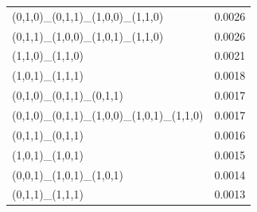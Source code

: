 \documentclass[11pt]{article}
\begin{document}
\begin{minipage}[t]{\linewidth}
\begin{tabular}{@{}lr@{}}
(0,1,0)\_(0,1,1)\_(1,0,0)\_(1,1,0)                & 0.0026 \\
(0,1,1)\_(1,0,0)\_(1,0,1)\_(1,1,0)                & 0.0026 \\
(1,1,0)\_(1,1,0)                                   & 0.0021 \\
(1,0,1)\_(1,1,1)                                   & 0.0018 \\
(0,1,0)\_(0,1,1)\_(0,1,1)                         & 0.0017 \\
(0,1,0)\_(0,1,1)\_(1,0,0)\_(1,0,1)\_(1,1,0)      & 0.0017 \\
(0,1,1)\_(0,1,1)                                   & 0.0016 \\
(1,0,1)\_(1,0,1)                                   & 0.0015 \\
(0,0,1)\_(1,0,1)\_(1,0,1)                         & 0.0014 \\
(0,1,1)\_(1,1,1)                                   & 0.0013 \\
\bottomrule
\end{tabular}
\end{minipage}
\hfill
\end{document}
